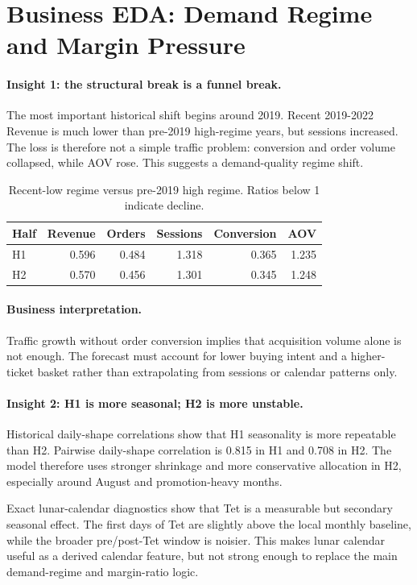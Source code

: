 \section{Business EDA: Demand Regime and Margin Pressure}

\paragraph{Insight 1: the structural break is a funnel break.}
The most important historical shift begins around 2019. Recent 2019-2022 Revenue is much lower than pre-2019 high-regime years, but sessions increased. The loss is therefore not a simple traffic problem: conversion and order volume collapsed, while AOV rose. This suggests a demand-quality regime shift.

\begin{table}[h]
\centering
\caption{Recent-low regime versus pre-2019 high regime. Ratios below 1 indicate decline.}
\label{tab:funnel_bridge}
\begin{tabular}{lrrrrr}
\toprule
Half & Revenue & Orders & Sessions & Conversion & AOV \\
\midrule
H1 & 0.596 & 0.484 & 1.318 & 0.365 & 1.235 \\
H2 & 0.570 & 0.456 & 1.301 & 0.345 & 1.248 \\
\bottomrule
\end{tabular}
\end{table}

\paragraph{Business interpretation.}
Traffic growth without order conversion implies that acquisition volume alone is not enough. The forecast must account for lower buying intent and a higher-ticket basket rather than extrapolating from sessions or calendar patterns only.

\paragraph{Insight 2: H1 is more seasonal; H2 is more unstable.}
Historical daily-shape correlations show that H1 seasonality is more repeatable than H2. Pairwise daily-shape correlation is 0.815 in H1 and 0.708 in H2. The model therefore uses stronger shrinkage and more conservative allocation in H2, especially around August and promotion-heavy months.

Exact lunar-calendar diagnostics show that Tet is a measurable but secondary seasonal effect. The first days of Tet are slightly above the local monthly baseline, while the broader pre/post-Tet window is noisier. This makes lunar calendar useful as a derived calendar feature, but not strong enough to replace the main demand-regime and margin-ratio logic.

